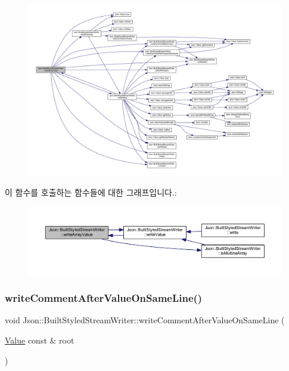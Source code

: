 \begin{figure}[H]
\begin{center}
\leavevmode
\includegraphics[width=350pt]{struct_json_1_1_built_styled_stream_writer_acd20e9274bbcf7876ef3af2e7d23a31f_cgraph}
\end{center}
\end{figure}
이 함수를 호출하는 함수들에 대한 그래프입니다.\+:\nopagebreak
\begin{figure}[H]
\begin{center}
\leavevmode
\includegraphics[width=350pt]{struct_json_1_1_built_styled_stream_writer_acd20e9274bbcf7876ef3af2e7d23a31f_icgraph}
\end{center}
\end{figure}
\mbox{\label{struct_json_1_1_built_styled_stream_writer_a89625b134fce0255263ca40e6125742b}} 
\subsubsection{\texorpdfstring{write\+Comment\+After\+Value\+On\+Same\+Line()}{writeCommentAfterValueOnSameLine()}}
{\footnotesize\ttfamily void Json\+::\+Built\+Styled\+Stream\+Writer\+::write\+Comment\+After\+Value\+On\+Same\+Line (\begin{DoxyParamCaption}\item[{\hyperlink{class_json_1_1_value}{Value} const \&}]{root }\end{DoxyParamCaption})\hspace{0.3cm}{\ttfamily [private]}}



